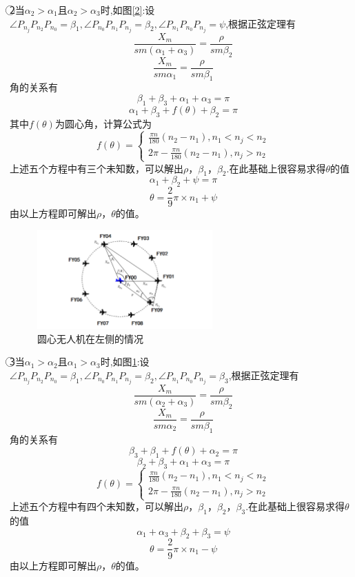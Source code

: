 \documentclass[withoutpreface,bwprint]{cumcmthesis} %
\begin{document}
	\textcircled{2}当$\alpha_2>\alpha_1$且$\alpha_2>\alpha_3$时,如图\ref{2}:设$\angle P_{n_j}P_{n_2}P_{n_0}=\beta_1, \angle P_{n_0}P_{n_1}P_{n_j}=\beta_2,
	\angle P_{n_1}P_{n_0}P_{n_j}=\psi$,根据正弦定理有
	$$\frac{X_m}{sm(\alpha_1+\alpha_3)}=\frac{\rho}{sm\beta_2}  $$
	$$\frac{X_m}{sm\alpha_1}=\frac{\rho}{sm\beta_1}$$
	角的关系有
	$$\beta_1+\beta_3+\alpha_1+\alpha_3=\pi$$
	$$	\alpha_1+\beta_3+ f(\theta)+\beta_2=\pi$$
	其中$f(\theta )$为圆心角，计算公式为
	$$f(\theta)=\left\{\begin{matrix} 
	\frac{\pi n}{180} (n_2-n_1),n_1<n_j<n_2  \\  
	2\pi-\frac{\pi n}{180} (n_2-n_1),n_j>n_2
	\end{matrix}\right.$$  
	上述五个方程中有三个未知数，可以解出$\rho$，$\beta_1$，$\beta_2$.在此基础上很容易求得$\theta$的值
	$$\alpha_1 + \beta_2 + \psi=\pi$$
	$$\theta=\frac{2}{9} \pi \times n_1+\psi$$
	由以上方程即可解出$\rho$，$\theta$的值。
	\begin{figure}[H]
		\centering
		\includegraphics[width=0.6\textwidth]{3}
		\caption{圆心无人机在左侧的情况}
		\label{3}
	\end{figure}
	\textcircled{3}当$\alpha_1>\alpha_2$且$\alpha_1>\alpha_3$时,如图\ref{3}:设 $\angle P_{n_j}P_{n_2}P_{n_0}=\beta_1, \angle P_{n_0}P_{n_1}P_{n_j}=\beta_2,
	\angle P_{n_1}P_{n_0}P_{n_j}=\beta_3$,根据正弦定理有
	$$\frac{X_m}{sm(\alpha_2+\alpha_3)}=\frac{\rho}{sm\beta_2}  $$
	$$\frac{X_m}{sm\alpha_2}=\frac{\rho}{sm\beta_1}$$
	角的关系有
	$$\beta_3+\beta_1+f(\theta)+\alpha_2=\pi$$
	$$ \beta_2+\beta_3+\alpha_1+\alpha_3=\pi$$
	$$f(\theta)=\left\{\begin{matrix} 
	\frac{\pi n}{180} (n_2-n_1),n_1<n_j<n_2  \\  
	2\pi-\frac{\pi n}{180} (n_2-n_1),n_j>n_2
	\end{matrix}\right.$$  
	上述五个方程中有四个未知数，可以解出$\rho$，$\beta_1$，$\beta_2$，$\beta_3$.在此基础上很容易求得$\theta$的值
	$$ \alpha_1+\alpha_3+\beta_2+\beta_3=\psi$$
	$$\theta =\frac{2}{9}\pi \times n_1-\psi$$
	由以上方程即可解出$\rho$，$\theta$的值。
	
\end{document}

